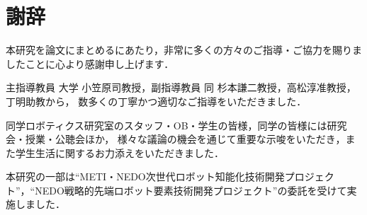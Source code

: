 

\section*{謝辞}

本研究を論文にまとめるにあたり，非常に多くの方々のご指導・ご協力を賜りましたことに心より感謝申し上げます．

主指導教員 大学 小笠原司教授，副指導教員 同 杉本謙二教授，高松淳准教授，丁明助教から，
数多くの丁寧かつ適切なご指導をいただきました．

同学ロボティクス研究室のスタッフ・OB・学生の皆様，同学の皆様には研究会・授業・公聴会ほか，
様々な議論の機会を通じて重要な示唆をいただき，また学生生活に関するお力添えをいただきました．


本研究の一部は``METI・NEDO次世代ロボット知能化技術開発プロジェクト''，``NEDO戦略的先端ロボット要素技術開発プロジェクト''の委託を受けて実施しました．


\endinput
